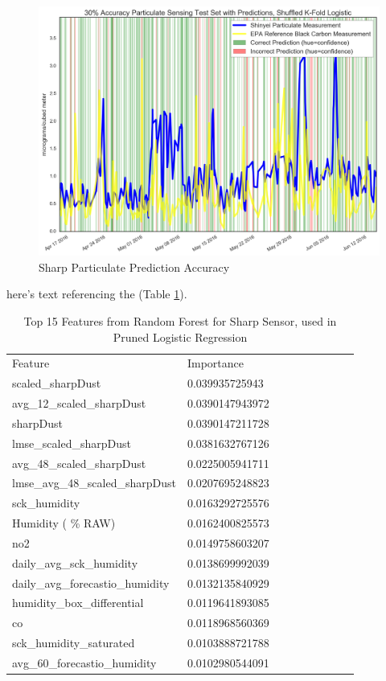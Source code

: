 \begin{figure}[htb]
 	\includegraphics[width=\textwidth]{figs/sharp_goals_30_logistic_predictions}               
 	 \caption{Sharp Particulate Prediction Accuracy}
  	\label{fig:sharp_30_logistic_predictions}
\end{figure}

here's text referencing the (Table \ref{tab:sharp_randomforest_features}).

\begin{table}[H]
\centering
\begin{tabular}{lllllllll}
\\
\\
\toprule
Feature & Importance \\
\midrule
 scaled\_sharpDust &  0.039935725943 \\
 avg\_12\_scaled\_sharpDust &  0.0390147943972 \\
 sharpDust &  0.0390147211728 \\
 lmse\_scaled\_sharpDust &  0.0381632767126 \\
 avg\_48\_scaled\_sharpDust &  0.0225005941711 \\
 lmse\_avg\_48\_scaled\_sharpDust &  0.0207695248823 \\
 sck\_humidity &  0.0163292725576 \\
 Humidity ( \% RAW) &  0.0162400825573 \\
 no2 &  0.0149758603207 \\
 daily\_avg\_sck\_humidity &  0.0138699992039 \\
 daily\_avg\_forecastio\_humidity &  0.0132135840929 \\
 humidity\_box\_differential &  0.0119641893085 \\
 co &  0.0118968560369 \\
 sck\_humidity\_saturated &  0.0103888721788 \\
 avg\_60\_forecastio\_humidity &  0.0102980544091 \\
\bottomrule
\end{tabular}
\label{tab:sharp_randomforest_features}
\caption{Top 15 Features from Random Forest for Sharp Sensor, used in Pruned Logistic Regression}
\end{table}


